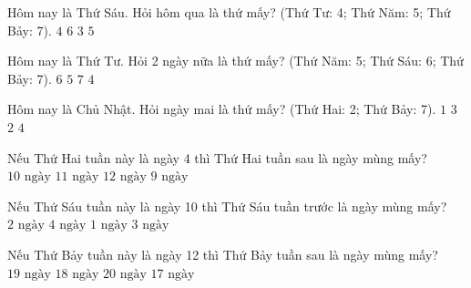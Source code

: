 \begin{ex} %
Hôm nay là Thứ Sáu. Hỏi hôm qua là thứ mấy? (Thứ Tư: 4; Thứ Năm: 5; Thứ Bảy: 7).
\choice
{$4$}
{$6$}
{$3$}
{\True $5$}
\end{ex}

\begin{ex} %
Hôm nay là Thứ Tư. Hỏi 2 ngày nữa là thứ mấy? (Thứ Năm: 5; Thứ Sáu: 6; Thứ Bảy: 7).
\choice
{\True $6$}
{$5$}
{$7$}
{$4$}
\end{ex}

\begin{ex} %
Hôm nay là Chủ Nhật. Hỏi ngày mai là thứ mấy? (Thứ Hai: 2; Thứ Bảy: 7).
\choice
{$1$}
{$3$}
{\True $2$}
{$4$}
\end{ex}

\begin{ex} %
Nếu Thứ Hai tuần này là ngày 4 thì Thứ Hai tuần sau là ngày mùng mấy?
\choice
{$10\text{ ngày}$}
{\True $11\text{ ngày}$}
{$12\text{ ngày}$}
{$9\text{ ngày}$}
\end{ex}

\begin{ex} %
Nếu Thứ Sáu tuần này là ngày 10 thì Thứ Sáu tuần trước là ngày mùng mấy?
\choice
{$2\text{ ngày}$}
{$4\text{ ngày}$}
{$1\text{ ngày}$}
{\True $3\text{ ngày}$}
\end{ex}

\begin{ex} %
Nếu Thứ Bảy tuần này là ngày 12 thì Thứ Bảy tuần sau là ngày mùng mấy?
\choice
{\True $19\text{ ngày}$}
{$18\text{ ngày}$}
{$20\text{ ngày}$}
{$17\text{ ngày}$}
\end{ex}

